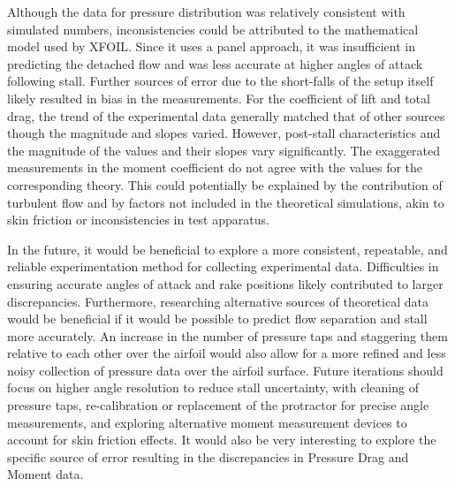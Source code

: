 \documentclass[11pt, letterpaper]{article}
\begin{document}
Although the data for pressure distribution was relatively consistent with simulated numbers, inconsistencies could be attributed to the mathematical model used by XFOIL. Since it uses a panel approach, it was insufficient in predicting the detached flow and was less accurate at higher angles of attack following stall. Further sources of error due to the short-falls of the setup itself likely resulted in bias in the measurements. For the coefficient of lift and total drag, the trend of the experimental data generally matched that of other sources though the magnitude and slopes varied. However, post-stall characteristics and the magnitude of the values and their slopes vary significantly. The exaggerated measurements in the moment coefficient do not agree with the values for the corresponding theory. This could potentially be explained by the contribution of turbulent flow and by factors not included in the theoretical simulations, akin to skin friction or inconsistencies in test apparatus. 

In the future, it would be beneficial to explore a more consistent, repeatable, and reliable experimentation method for collecting experimental data. Difficulties in ensuring accurate angles of attack and rake positions likely contributed to larger discrepancies. Furthermore, researching alternative sources of theoretical data would be beneficial if it would be possible to predict flow separation and stall more accurately. An increase in the number of pressure taps and staggering them relative to each other over the airfoil would also allow for a more refined and less noisy collection of pressure data over the airfoil surface. Future iterations should focus on higher angle resolution to reduce stall uncertainty, with cleaning of pressure taps, re-calibration or replacement of the protractor for precise angle measurements, and exploring alternative moment measurement devices to account for skin friction effects. It would also be very interesting to explore the specific source of error resulting in the discrepancies in Pressure Drag and Moment data.


\newpage



\newpage
\end{document}
